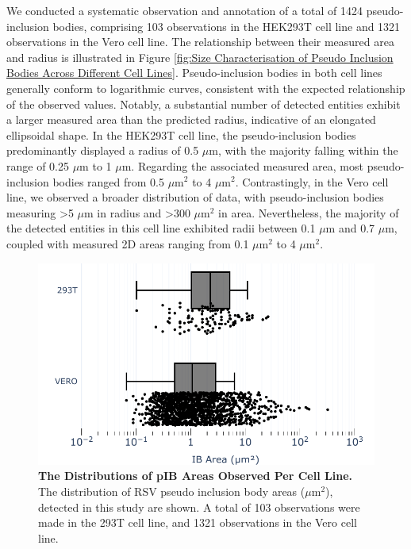 We conducted a systematic observation and annotation of a total of 1424 pseudo-inclusion bodies, comprising 103 observations in the HEK293T cell line and 1321 observations in the Vero cell line. The relationship between their measured area and radius is illustrated in Figure \ref{fig:Size Characterisation of Pseudo Inclusion Bodies Across Different Cell Lines}. Pseudo-inclusion bodies in both cell lines generally conform to logarithmic curves, consistent with the expected relationship of the observed values. Notably, a substantial number of detected entities exhibit a larger measured area than the predicted radius, indicative of an elongated ellipsoidal shape. In the HEK293T cell line, the pseudo-inclusion bodies predominantly displayed a radius of 0.5 \(\mu \mbox{m}\), with the majority falling within the range of 0.25 \(\mu \mbox{m}\) to 1 \(\mu \mbox{m}\). Regarding the associated measured area, most pseudo-inclusion bodies ranged from 0.5 \(\mu \mbox{m}^2\) to 4 \(\mu \mbox{m}^2\). Contrastingly, in the Vero cell line, we observed a broader distribution of data, with pseudo-inclusion bodies measuring >5 \(\mu \mbox{m}\) in radius and >300 \(\mu \mbox{m}^2\) in area. Nevertheless, the majority of the detected entities in this cell line exhibited radii between 0.1 \(\mu \mbox{m}\) and 0.7 \(\mu \mbox{m}\), coupled with measured 2D areas ranging from 0.1 \(\mu \mbox{m}^2\) to 4 \(\mu \mbox{m}^2\).

\begin{figure}
    \centering
    \includegraphics[width=0.75\linewidth]{09. Chapter 4/Figs/01. pIB/01. pIB characterisation/03. box-pib.pdf}
    \caption[The Distributions of pIB Areas Observed Per Cell Line.]{\textbf{The Distributions of pIB Areas Observed Per Cell Line.} The distribution of RSV pseudo inclusion body areas (\(\mu \mbox{m}^2\)), detected in this study are shown. A total of 103 observations were made in the 293T cell line, and 1321 observations in the Vero cell line.}
    \label{fig:The Distributions of pIB Areas Observed Per Cell Line}
\end{figure}

